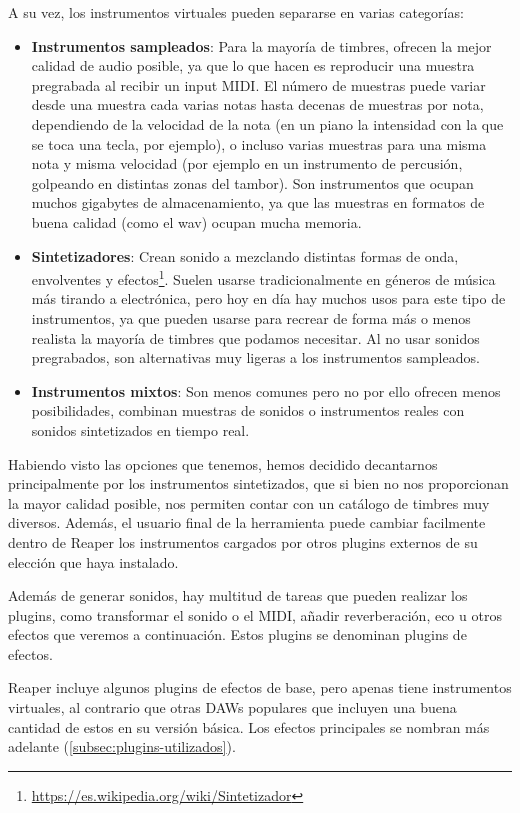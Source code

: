 A su vez, los instrumentos virtuales pueden separarse en varias categorías:
\begin{itemize}
    \item \textbf{Instrumentos sampleados}: Para la mayoría de timbres, ofrecen la mejor calidad de audio posible, ya que lo que hacen es reproducir una muestra pregrabada al recibir un input MIDI. El número de muestras puede variar desde una muestra cada varias notas hasta decenas de muestras por nota, dependiendo de la velocidad de la nota (en un piano la intensidad con la que se toca una tecla, por ejemplo), o incluso varias muestras para una misma nota y misma velocidad (por ejemplo en un instrumento de percusión, golpeando en distintas zonas del tambor). Son instrumentos que ocupan muchos gigabytes de almacenamiento, ya que las muestras en formatos de buena calidad (como el wav) ocupan mucha memoria.
    \item \textbf{Sintetizadores}: Crean sonido a mezclando distintas formas de onda, envolventes y efectos\footnote{\url{https://es.wikipedia.org/wiki/Sintetizador}}. Suelen usarse tradicionalmente en géneros de música más tirando a electrónica, pero hoy en día hay muchos usos para este tipo de instrumentos, ya que pueden usarse para recrear de forma más o menos realista la mayoría de timbres que podamos necesitar. Al no usar sonidos pregrabados, son alternativas muy ligeras a los instrumentos sampleados.
    \item \textbf{Instrumentos mixtos}: Son menos comunes pero no por ello ofrecen menos posibilidades, combinan muestras de sonidos o instrumentos reales con sonidos sintetizados en tiempo real.
\end{itemize}
Habiendo visto las opciones que tenemos, hemos decidido decantarnos principalmente por los instrumentos sintetizados, que si bien no nos proporcionan la mayor calidad posible, nos permiten contar con un catálogo de timbres muy diversos. Además, el usuario final de la herramienta puede cambiar facilmente dentro de Reaper los instrumentos cargados por otros plugins externos de su elección que haya instalado.

Además de generar sonidos, hay multitud de tareas que pueden realizar los plugins, como transformar el sonido o el MIDI, añadir reverberación, eco u otros efectos que veremos a continuación. Estos plugins se denominan plugins de efectos.

Reaper incluye algunos plugins de efectos de base, pero apenas tiene instrumentos virtuales, al contrario que otras DAWs populares que incluyen una buena cantidad de estos en su versión básica. Los efectos principales se nombran más adelante (\ref{subsec:plugins-utilizados}).

